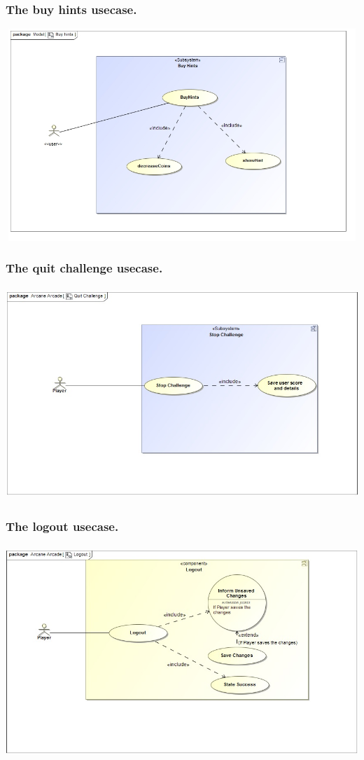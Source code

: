 \documentclass[english]{article}
\begin{document}
		\subsubsection* {The buy hints usecase.}
		\includegraphics[width=14cm,height=8cm,keepaspectratio]{BuyHints.jpg}		
		
		\subsubsection* {The quit challenge usecase.}
		\includegraphics[width=14cm,height=8cm,keepaspectratio]{quitChallenge.jpg}
		
		\subsubsection* {The logout usecase.}
		\includegraphics[width=14cm,height=8cm,keepaspectratio]{logOut.jpg}
		
\end{document}
